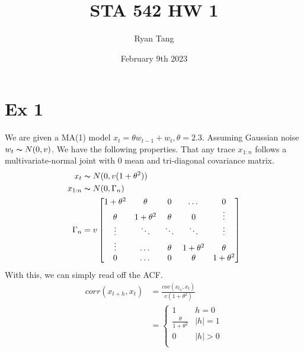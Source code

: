 \documentclass[11pt, letterpaper]{article}
\author{Ryan Tang}
\title{STA 542 HW 1}
\date{February 9th 2023}
\begin{document}
\maketitle

\section{Ex 1}
We are given a MA(1) model $x_t = \theta w_{t-1} + w_t, \theta=2.3$. Assuming Gaussian noise $w_t \thicksim N(0, v)$. We have the following properties. That any trace $x_{1:n}$ follows a multivariate-normal joint with $0$ mean and tri-diagonal covariance matrix.
\begin{align*}
    x_t &\thicksim N(0, v(1+\theta^2)) \\
    x_{1:n} &\thicksim N(0, \Gamma_n) \\
    \Gamma_n &= v \begin{bmatrix}
        1+\theta^2 & \theta & 0 & \dots & 0 \\
        \theta & 1+\theta^2 & \theta & 0 & \vdots \\
        \vdots & \ddots & \ddots & \ddots & \vdots\\
        \vdots & \dots & \theta & 1+\theta^2 & \theta \\
        0 & \dots & 0 & \theta & 1+\theta^2 \\
    \end{bmatrix} \\
\end{align*}
With this, we can simply read off the ACF.
\begin{align*}
    corr(x_{t+h}, x_t) &= \frac{cov(x_{t_h}, x_t)}{v(1+\theta^2)} \\
        &= \begin{cases}
            1 & h=0 \\
            \frac{\theta}{1+\theta^2} & |h|=1 \\
            0 & |h|>0 \\
        \end{cases}
\end{align*}
\end{document}
